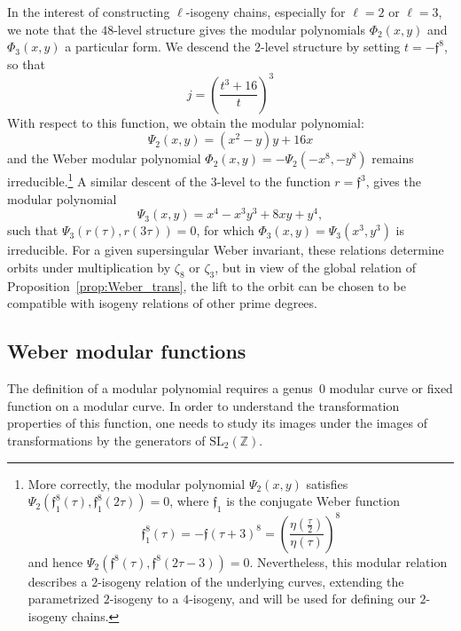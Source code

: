 \documentclass{amsart}
\newcommand{\ZZ}{\mathbb{Z}}
\newcommand{\SL}{\mathrm{SL}}
\newcommand{\ff}{\mathfrak{f}}
\begin{document}
In the interest of constructing $\ell$-isogeny chains, especially for $\ell = 2$
or $\ell = 3$, we note that the $48$-level structure gives the modular polynomials
$\Phi_2(x,y)$ and $\Phi_3(x,y)$ a particular form.  We descend the $2$-level
structure by setting $t = -\ff^8$, so that
$$
j = \left(\frac{t^3+16}{t}\right)^3
$$
With respect to this function, we obtain the modular polynomial: 
$$
\Psi_2(x,y) = (x^2 - y)y + 16x
$$
and the Weber modular polynomial $\Phi_2(x,y) = -\Psi_2(-x^8,-y^8)$ remains
irreducible.\footnote{
More correctly, the modular polynomial $\Psi_2(x,y)$ satisfies
$\Psi_2(\ff_1^8(\tau),\ff_1^8(2\tau)) = 0$, where $\ff_1$ is the conjugate Weber function
$$
\ff_1^8(\tau) = -\ff(\tau+3)^8 = \left(\frac{\eta(\frac{\tau}{2})}{\eta(\tau)}\right)^8
$$
and hence $\Psi_2(\ff^8(\tau),\ff^8(2\tau-3)) = 0$.  Nevertheless, this modular relation
describes a $2$-isogeny relation of the underlying curves, extending the parametrized
$2$-isogeny to a $4$-isogeny, and will be used for defining our $2$-isogeny chains.}
A similar descent of the $3$-level to the function $r = \ff^3$, gives the modular polynomial
$$
\Psi_3(x,y) = x^4 - x^3 y^3 + 8 x y + y^4,
$$
such that $\Psi_3(r(\tau),r(3\tau)) = 0$, for which $\Phi_3(x,y) = \Psi_3(x^3,y^3)$
is irreducible.  For a given supersingular Weber invariant, these relations determine
orbits under multiplication by $\zeta_8$ or $\zeta_3$, but in view of the global
relation of Proposition~\ref{prop:Weber_trans}, the lift to the orbit can be chosen to be
compatible with isogeny relations of other prime degrees.

\subsection*{Weber modular functions}
The definition of a modular polynomial requires a genus~$0$ modular curve or
fixed function on a modular curve.  In order to understand the transformation
properties of this function, one needs to study its images under the images
of transformations by the generators of $\SL_2(\ZZ)$.  
\end{document}
